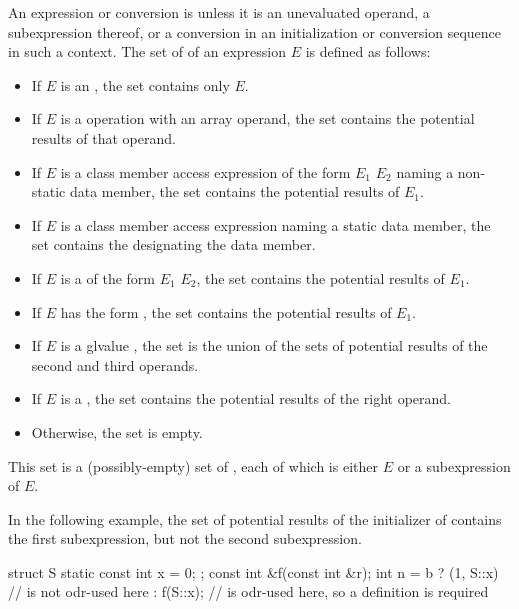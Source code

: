 \pnum
{}%
An expression or conversion is  unless it is
an unevaluated operand,
a subexpression thereof, or
a conversion in an initialization or conversion sequence in such a context.
The set of  of an expression $E$ is
defined as follows:
\begin{itemize}
\item If $E$ is an
, the set
contains only $E$.
\item If $E$ is a  operation with
an array operand, the set contains the potential results of that operand.
\item If $E$ is a class member access
expression of the form
$E_1$   $E_2$
naming a non-static data member,
the set contains the potential results of $E_1$.
\item If $E$ is a class member access expression
naming a static data member,
the set contains the  designating the data member.
\item If $E$ is a  of the form
$E_1$  $E_2$,
the set contains the potential results of $E_1$.
\item If $E$ has the form , the set contains the
potential results of $E_1$.
\item If $E$ is a glvalue ,
the set is the union of the sets of
potential results of the second and third operands.
\item If $E$ is a , the set
contains the potential results of the right operand.
\item Otherwise, the set is empty.
\end{itemize}
\begin{note}
This set is a (possibly-empty) set of ,
each of which is either $E$ or a subexpression of $E$.
\begin{example}
In the following example, the set of potential results of the initializer
of  contains the first  subexpression, but not the second
 subexpression.
\begin{codeblock}
struct S { static const int x = 0; };
const int &f(const int &r);
int n = b ? (1, S::x)           //  is not odr-used here
          : f(S::x);            //  is odr-used here, so a definition is required
\end{codeblock}
\end{example}
\end{note}

